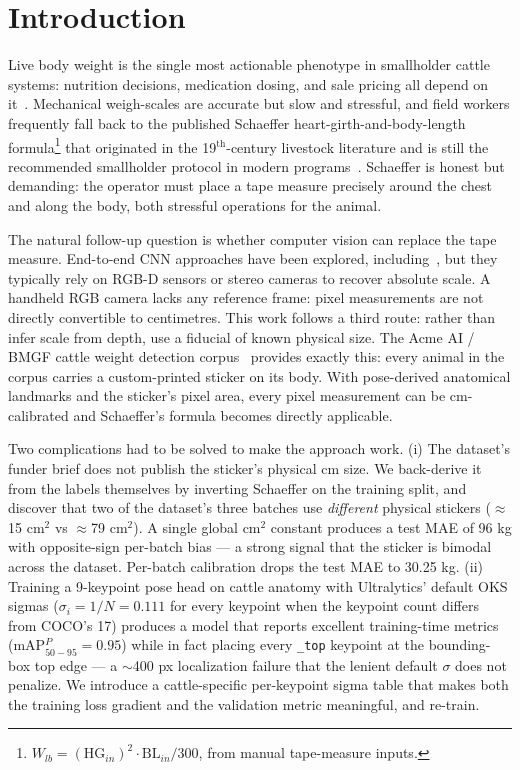 \documentclass[conference]{IEEEtran}
\begin{document}
\section{Introduction}

Live body weight is the single most actionable phenotype in smallholder cattle systems: nutrition decisions, medication dosing, and sale pricing all depend on it~\cite{bewley2008,vyas2021}. Mechanical weigh-scales are accurate but slow and stressful, and field workers frequently fall back to the published Schaeffer heart-girth-and-body-length formula\footnote{$W_{lb} = (\text{HG}_{in})^2 \cdot \text{BL}_{in} / 300$, from manual tape-measure inputs.} that originated in the 19$^\text{th}$-century livestock literature and is still the recommended smallholder protocol in modern programs~\cite{edmonson1989,ozkaya2013}. Schaeffer is honest but demanding: the operator must place a tape measure precisely around the chest and along the body, both stressful operations for the animal.

The natural follow-up question is whether computer vision can replace the tape measure. End-to-end CNN approaches have been explored, including~\cite{gjergji2021,wang2022,qiao2021}, but they typically rely on RGB-D sensors or stereo cameras to recover absolute scale. A handheld RGB camera lacks any reference frame: pixel measurements are not directly convertible to centimetres. This work follows a third route: rather than infer scale from depth, use a fiducial of known physical size. The Acme AI / BMGF cattle weight detection corpus~\cite{kaggle_acme_bmgf} provides exactly this: every animal in the corpus carries a custom-printed sticker on its body. With pose-derived anatomical landmarks and the sticker's pixel area, every pixel measurement can be cm-calibrated and Schaeffer's formula becomes directly applicable.

Two complications had to be solved to make the approach work. (i) The dataset's funder brief does not publish the sticker's physical cm size. We back-derive it from the labels themselves by inverting Schaeffer on the training split, and discover that two of the dataset's three batches use \textit{different} physical stickers ($\approx$15 cm$^2$ vs $\approx$79 cm$^2$). A single global cm$^2$ constant produces a test MAE of 96 kg with opposite-sign per-batch bias --- a strong signal that the sticker is bimodal across the dataset. Per-batch calibration drops the test MAE to 30.25 kg. (ii) Training a 9-keypoint pose head on cattle anatomy with Ultralytics' default OKS sigmas ($\sigma_i = 1/N = 0.111$ for every keypoint when the keypoint count differs from COCO's 17) produces a model that reports excellent training-time metrics (mAP$_{50-95}^{P} = 0.95$) while in fact placing every \texttt{\_top} keypoint at the bounding-box top edge --- a $\sim$400 px localization failure that the lenient default $\sigma$ does not penalize. We introduce a cattle-specific per-keypoint sigma table that makes both the training loss gradient and the validation metric meaningful, and re-train.
\end{document}
